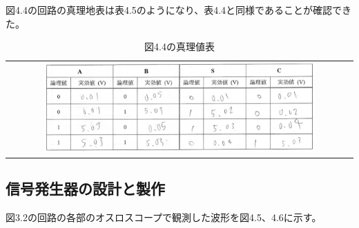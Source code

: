 \documentclass{jlreq}
\numberwithin{equation}{section}
\begin{document}
図4.4の回路の真理地表は表4.5のようになり、表4.4と同様であることが確認できた。

\begin{table}[H]
  \centering
  \caption{図4.4の真理値表}
  \begin{tabular}{c}
    \includegraphics[width=0.8\textwidth]{assets/hanandnotshinri.png} \\
  \end{tabular}
  \end{table}

\subsection{信号発生器の設計と製作}
図3.2の回路の各部のオスロスコープで観測した波形を図4.5、4.6に示す。
\end{document}
